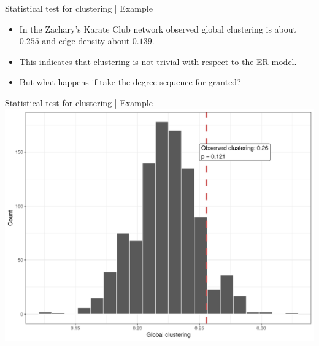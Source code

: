 \documentclass[
    hyperref={colorlinks,linkcolor=blue,urlcolor=blue,citecolor=blue}
]{beamer}
\begin{document}
\begin{frame}{Statistical test for clustering | Example}
\begin{itemize}
    \item<2-> In the Zachary's Karate Club network observed global
    clustering is about $0.255$ and edge density about $0.139$.
    \item<3-> This indicates that clustering is not trivial with
    respect to the ER model.
    \item<4-> But what happens if take the degree sequence for granted?
\end{itemize}
\end{frame}

\begin{frame}{Statistical test for clustering | Example}
\centering
\includegraphics[width=.9\textwidth]{structure/conf_model_karate_plot-1}
\end{frame}
\end{document}
